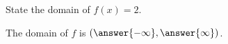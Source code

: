 \documentclass{ximera}
\author{Carl Stitz \and Jeff Zeager \and Bart Snapp \and Matthew Carr}
\begin{document}
\begin{exercise}



State the domain of $f(x)=2$.
\begin{center}
The domain of $f$ is $(\answer{-\infty},\answer{\infty})$.
\end{center}

\end{exercise}
\end{document}
